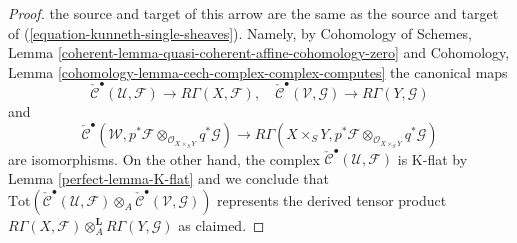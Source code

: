 \begin{proof}
the source and target of this arrow are the same as the source
and target of (\ref{equation-kunneth-single-sheaves}). Namely, by
Cohomology of Schemes, Lemma
\ref{coherent-lemma-quasi-coherent-affine-cohomology-zero}
and
Cohomology, Lemma \ref{cohomology-lemma-cech-complex-complex-computes}
the canonical maps
$$
\check{\mathcal{C}}^\bullet(\mathcal{U}, \mathcal{F})
\to
R\Gamma(X, \mathcal{F}),
\quad
\check{\mathcal{C}}^\bullet(\mathcal{V}, \mathcal{G})
\to
R\Gamma(Y, \mathcal{G})
$$
and
$$
\check{\mathcal{C}}^\bullet(\mathcal{W},
p^*\mathcal{F} \otimes_{\mathcal{O}_{X \times_S Y}} q^*\mathcal{G})
\to
R\Gamma(X \times_S Y,
p^*\mathcal{F} \otimes_{\mathcal{O}_{X \times_S Y}}
q^*\mathcal{G})
$$
are isomorphisms. On the other hand, the complex
$\check{\mathcal{C}}^\bullet(\mathcal{U}, \mathcal{F})$
is K-flat by Lemma \ref{perfect-lemma-K-flat} and we conclude that
$\text{Tot}(
\check{\mathcal{C}}^\bullet(\mathcal{U}, \mathcal{F})
\otimes_A
\check{\mathcal{C}}^\bullet(\mathcal{V}, \mathcal{G}))$
represents the derived tensor product
$R\Gamma(X, \mathcal{F}) \otimes_A^\mathbf{L} R\Gamma(Y, \mathcal{G})$
as claimed.


\end{proof}
